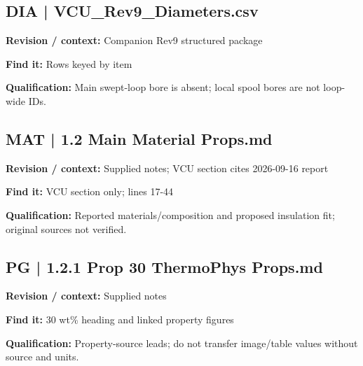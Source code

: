 \documentclass[11pt]{article}
\begin{document}
\par\noindent\begin{minipage}{\textwidth}\small
\subsection*{DIA | VCU\_\allowbreak{}Rev9\_\allowbreak{}Diameters.csv}
\textbf{Revision / context:} Companion Rev9 structured package\par
\textbf{Find it:} Rows keyed by item\par
\textbf{Qualification:} Main swept-loop bore is absent; local spool bores are not loop-wide IDs.\par
\end{minipage}\par\vspace{5pt}
\par
\par\noindent\begin{minipage}{\textwidth}\small
\subsection*{MAT | 1.2 Main Material Props.md}
\textbf{Revision / context:} Supplied notes; VCU section cites 2026-09-16 report\par
\textbf{Find it:} VCU section only; lines 17-44\par
\textbf{Qualification:} Reported materials/composition and proposed insulation fit; original sources not verified.\par
\end{minipage}\par\vspace{5pt}
\par\noindent\begin{minipage}{\textwidth}\small
\subsection*{PG | 1.2.1 Prop 30 ThermoPhys Props.md}
\textbf{Revision / context:} Supplied notes\par
\textbf{Find it:} 30 wt\% heading and linked property figures\par
\textbf{Qualification:} Property-source leads; do not transfer image/table values without source and units.\par
\end{minipage}\par\vspace{5pt}
\end{document}
